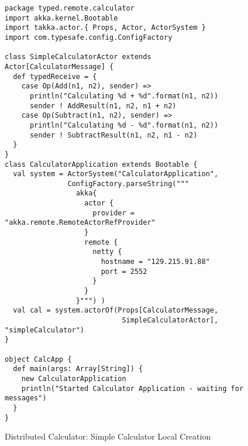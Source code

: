 \begin{figure}[p]
\begin{lstlisting}
package typed.remote.calculator
import akka.kernel.Bootable
import takka.actor.{ Props, Actor, ActorSystem }
import com.typesafe.config.ConfigFactory

class SimpleCalculatorActor extends Actor[CalculatorMessage] {
  def typedReceive = {
    case Op(Add(n1, n2), sender) =>
      println("Calculating %d + %d".format(n1, n2))
      sender ! AddResult(n1, n2, n1 + n2)
    case Op(Subtract(n1, n2), sender) =>
      println("Calculating %d - %d".format(n1, n2))
      sender ! SubtractResult(n1, n2, n1 - n2)
  }
}
class CalculatorApplication extends Bootable {
  val system = ActorSystem("CalculatorApplication",
               ConfigFactory.parseString(""" 
                 akka{
                   actor {
                     provider = "akka.remote.RemoteActorRefProvider"
                   }
                   remote {
                     netty {                       
                       hostname = "129.215.91.88"
                       port = 2552       
                     }
                   }
                 }""") )
  val cal = system.actorOf(Props[CalculatorMessage, 
                            SimpleCalculatorActor], "simpleCalculator")
}

object CalcApp {
  def main(args: Array[String]) {
    new CalculatorApplication
    println("Started Calculator Application - waiting for messages")
  }
}
\end{lstlisting}
\caption{Distributed Calculator: Simple Calculator Local Creation}
\label{discal_local_creation}
\end{figure}

